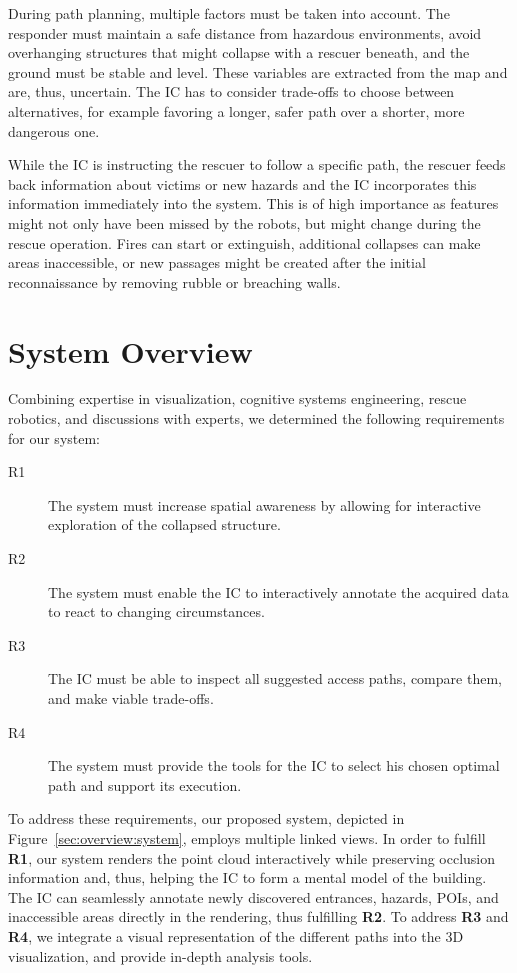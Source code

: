 \documentclass{egpubl}
\begin{document}
During path planning, multiple factors must be taken into account. The responder must maintain a safe distance from hazardous environments, avoid overhanging structures that might collapse with a rescuer beneath, and the ground must be stable and level. These variables are extracted from the map and are, thus, uncertain. The IC has to consider trade-offs to choose between alternatives, for example favoring a longer, safer path over a shorter, more dangerous one.

While the IC is instructing the rescuer to follow a specific path, the rescuer feeds back information about victims or new hazards and the IC incorporates this information immediately into the system. This is of high importance as features might not only have been missed by the robots, but might change during the rescue operation. Fires can start or extinguish, additional collapses can make areas inaccessible, or new passages might be created after the initial reconnaissance by removing rubble or breaching walls.


\section{System Overview} \label{sec:overview}

Combining expertise in visualization, cognitive systems engineering, rescue robotics, and discussions with experts, we determined the following requirements for our system:
\begin{description}
\item[R1] The system must increase spatial awareness by allowing for interactive exploration of the collapsed structure.
\item[R2] The system must enable the IC to interactively annotate the acquired data to react to changing circumstances.
\item[R3] The IC must be able to inspect all suggested access paths, compare them, and make viable trade-offs.
\item[R4] The system must provide the tools for the IC to select his chosen optimal path and support its execution.
\end{description}

To address these requirements, our proposed system, depicted in Figure~\ref{sec:overview:system}, employs multiple linked views. In order to fulfill {\bfseries R1}, our system renders the point cloud interactively while preserving occlusion information and, thus, helping the IC to form a mental model of the building. The IC can seamlessly annotate newly discovered entrances, hazards, POIs, and inaccessible areas directly in the rendering, thus fulfilling {\bfseries R2}. To address {\bfseries R3} and {\bfseries R4}, we integrate a visual representation of the different paths into the 3D visualization, and provide in-depth analysis tools.
\end{document}

